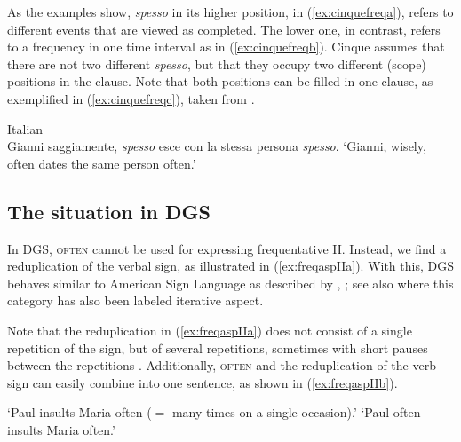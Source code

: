 \noindent As the examples show, \textit{spesso} in its higher position, in (\ref{ex:cinquefreqa}), refers to different events that are viewed as completed. The lower one, in contrast, refers to a frequency in one time interval as in (\ref{ex:cinquefreqb}). Cinque assumes that there are not two different \textit{spesso}, but that they occupy two different (scope) positions in the clause. Note that both positions can be filled in one clause, as exemplified in (\ref{ex:cinquefreqc}), taken from \citet[92]{cinque1999adverbs}.

\begin{exe}

\ex Italian \citep[92]{cinque1999adverbs} \\ {Gianni saggiamente, \textit{spesso} esce con la stessa persona \textit{spesso}.} 
\glt `Gianni, wisely, often dates the same person often.' \label{ex:cinquefreqc}

\end{exe} 


\subsection{The situation in DGS}
\noindent In DGS, \textsc{often} cannot be used for expressing frequentative II. Instead, we find a reduplication of the verbal sign, as illustrated in (\ref{ex:freqaspIIa}). With this, DGS behaves similar to American Sign Language as described by , \citet{klima1979signs,rathmann2005event}; see also \citet{pfausteinbwol2012tense} where this category has also been labeled iterative aspect.

Note that the reduplication in (\ref{ex:freqaspIIa}) does not consist of a single repetition of the sign, but of several repetitions, sometimes with short pauses between the repetitions \citep[163]{papaspyrou2008grammatik}. Additionally, \textsc{often} and the reduplication of the verb sign can easily combine into one sentence, as shown in (\ref{ex:freqaspIIb}).


\begin{exe}
\ex\label{frequecsaca}\begin{xlist} 
\glt `Paul insults Maria often ($=$ many times on a single occasion).' \label{ex:freqaspIIa}
\glt `Paul often insults Maria often.' \label{ex:freqaspIIb}
\end{xlist}
\end{exe} 

